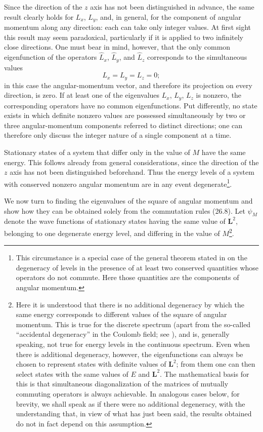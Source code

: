 Since the direction of the $z$ axis has not been distinguished in advance,
the same result clearly holds for $L_x$, $L_y$, and, in general, for the
component of angular momentum along any direction: each can take only integer
values. At first sight this result may seem paradoxical, particularly if it
is applied to two infinitely close directions. One must bear in mind,
however, that the only common eigenfunction of the operators $\hat L_x$,
$\hat L_y$, and $\hat L_z$ corresponds to the simultaneous values
\[
  L_x=L_y=L_z=0;
\]
in this case the angular-momentum vector, and therefore its projection on
every direction, is zero. If at least one
of the eigenvalues $L_x$, $L_y$, $L_z$ is nonzero, the corresponding
operators have no common eigenfunctions. Put differently, no state exists in
which definite nonzero values are possessed simultaneously by two or three
angular-momentum components referred to distinct directions; one can therefore
only discuss the integer nature of a single component at a time.

Stationary states of a system that differ only in the value of $M$ have the
same energy. This follows already from general considerations, since the
direction of the $z$ axis has not been distinguished beforehand. Thus the
energy levels of a system with conserved nonzero angular momentum are in any
event degenerate\footnote{This circumstance is a special case of the general
theorem stated in  on the degeneracy of levels in the presence of at
least two conserved quantities whose operators do not commute. Here those
quantities are the components of angular momentum.}.

We now turn to finding the eigenvalues of the square of angular momentum and
show how they can be obtained solely from the commutation rules (26.8). Let
$\psi_M$ denote the wave functions of stationary states having the same value
of $\mathbf L^2$, belonging to one degenerate energy level, and differing in
the value of $M$\footnote{Here it is understood that there is no additional
degeneracy by which the same energy corresponds to different values of the
square of angular momentum. This is true for the discrete spectrum (apart
from the so-called “accidental degeneracy” in the Coulomb field; see
), and is, generally speaking, not true for energy levels in the
continuous spectrum. Even when there is additional degeneracy, however, the
eigenfunctions can always be chosen to represent states with definite values
of $\mathbf L^2$; from them one can then select states with the same values of
$E$ and $\mathbf L^2$. The mathematical basis for this is that simultaneous
diagonalization of the matrices of mutually commuting operators is always
achievable. In analogous cases below, for brevity, we shall speak as if
there were no additional degeneracy, with the understanding that, in view of
what has just been said, the results obtained do not in fact depend on this
assumption.}.

